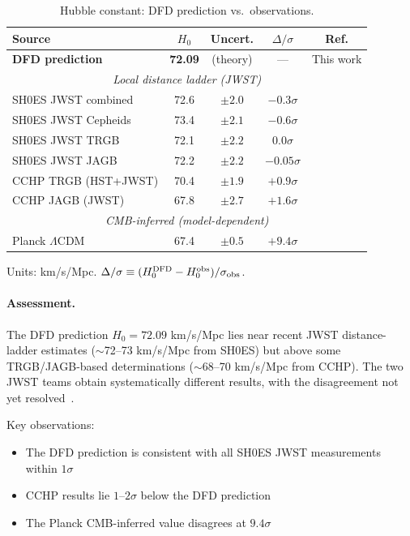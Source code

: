 \begin{table}[h]
\centering
\caption{Hubble constant: DFD prediction vs.\ observations.}\label{tab:H0-comparison}
\begin{ruledtabular}
\scriptsize
\begin{tabular}{lcccc}
\textbf{Source} & $H_0$ & \textbf{Uncert.} & \textbf{$\Delta/\sigma$} & \textbf{Ref.} \\
\hline
\textbf{DFD prediction} & \textbf{72.09} & (theory) & --- & This work \\
\hline
\multicolumn{5}{c}{\textit{Local distance ladder (JWST)}} \\
SH0ES JWST combined & 72.6 & $\pm 2.0$ & $-0.3\sigma$ & \cite{Riess2024JWST} \\
SH0ES JWST Cepheids & 73.4 & $\pm 2.1$ & $-0.6\sigma$ & \cite{Riess2024JWST} \\
SH0ES JWST TRGB & 72.1 & $\pm 2.2$ & $0.0\sigma$ & \cite{Riess2024JWST} \\
SH0ES JWST JAGB & 72.2 & $\pm 2.2$ & $-0.05\sigma$ & \cite{Riess2024JWST} \\
CCHP TRGB (HST+JWST) & 70.4 & $\pm 1.9$ & $+0.9\sigma$ & \cite{Freedman2024JWST} \\
CCHP JAGB (JWST) & 67.8 & $\pm 2.7$ & $+1.6\sigma$ & \cite{Freedman2024JWST} \\
\hline
\multicolumn{5}{c}{\textit{CMB-inferred (model-dependent)}} \\
Planck $\Lambda$CDM & 67.4 & $\pm 0.5$ & $+9.4\sigma$ & \cite{Planck2018VI} \\
\end{tabular}
\end{ruledtabular}
\vspace{1mm}
{\scriptsize Units: km/s/Mpc. $\Delta/\sigma \equiv (H_0^{\rm DFD} - H_0^{\rm obs})/\sigma_{\rm obs}$.}
\end{table}

\paragraph{Assessment.}
The DFD prediction $H_0 = 72.09$ km/s/Mpc lies near recent JWST distance-ladder estimates ($\sim$72--73 km/s/Mpc from SH0ES) but above some TRGB/JAGB-based determinations ($\sim$68--70 km/s/Mpc from CCHP). The two JWST teams obtain systematically different results, with the disagreement not yet resolved~\cite{Riess2024JWST,Freedman2024JWST}.

Key observations:
\begin{itemize}
\item The DFD prediction is consistent with all SH0ES JWST measurements within $1\sigma$
\item CCHP results lie $1$--$2\sigma$ below the DFD prediction
\item The Planck CMB-inferred value disagrees at $9.4\sigma$
\end{itemize}

